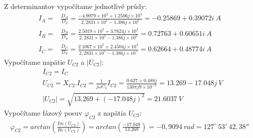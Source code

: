 Z determinantov vypočítame jednotlivé prúdy: 
\begin{align*}
    I_A = & \frac{D_A}{D_S} = \frac{-4.9079 \times 10^3 + 1.2506j \times 10^5}{2,2831 \times 10^{5} - 1.386j \times 10^{5}} = -0.25869 + 0.39072i~A\\
    I_B = & \frac{D_B}{D_S} = \frac{2.5019 \times 10^5 + 3.7624j \times 10^4}{2,2831 \times 10^{5} - 1.386j \times 10^{5}} = 0.72763 + 0.60651i~A \\
    I_C = & \frac{D_C}{D_S} = \frac{2.1067 \times 10^5 + 2.4504j \times 10^4}{2,2831 \times 10^{5} - 1.386j \times 10^{5}} = 0.62664 + 0.48774i~A
\end{align*}
Vypočítame napätie $U_{C2}$ a $|U_{C2}|$:
\begin{align*}
    &I_{C2} =  I_C \\
    &U_{C2} = X_{C2} . I_{C2} = \frac{1}{j \omega C_2} I_{C2} = \frac{0.627 + 0.488j}{130 \pi j 9 \times 10^{-5}} = 13.269 - 17.048j~V \\ 
    &|U_{C2}| =  \sqrt{13.269 +(-17.048j)^2} = 21.6037~V
\end{align*}
Vypočítame fázový posuv $ \varphi_{C2}$ z napätia $U_{C2}$:
\begin{align*}
    \varphi_{C2} = arctan \left( \frac{Im(U_{C2})}{Re(U_{C2})} \right) = arctan \left( \frac{-17.048}{13.269} \right) = -0,9094~rad = 127^\circ~53'~42,38''
\end{align*}


\newpage 
